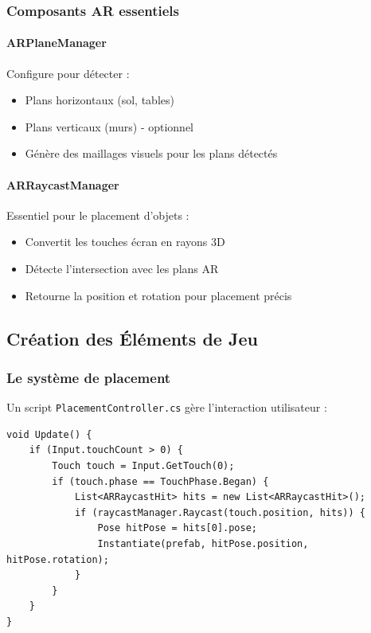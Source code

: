 \documentclass[12pt,a4paper]{article}
\begin{document}
\subsubsection{Composants AR essentiels}

\paragraph{ARPlaneManager}
Configure pour détecter :
\begin{itemize}
    \item Plans horizontaux (sol, tables)
    \item Plans verticaux (murs) - optionnel
    \item Génère des maillages visuels pour les plans détectés
\end{itemize}

\paragraph{ARRaycastManager}
Essentiel pour le placement d'objets :
\begin{itemize}
    \item Convertit les touches écran en rayons 3D
    \item Détecte l'intersection avec les plans AR
    \item Retourne la position et rotation pour placement précis
\end{itemize}

\subsection{Création des Éléments de Jeu}

\subsubsection{Le système de placement}

Un script \texttt{PlacementController.cs} gère l'interaction utilisateur :

\begin{lstlisting}[caption=Extrait du PlacementController]
void Update() {
    if (Input.touchCount > 0) {
        Touch touch = Input.GetTouch(0);
        if (touch.phase == TouchPhase.Began) {
            List<ARRaycastHit> hits = new List<ARRaycastHit>();
            if (raycastManager.Raycast(touch.position, hits)) {
                Pose hitPose = hits[0].pose;
                Instantiate(prefab, hitPose.position, hitPose.rotation);
            }
        }
    }
}
\end{lstlisting}
\end{document}
